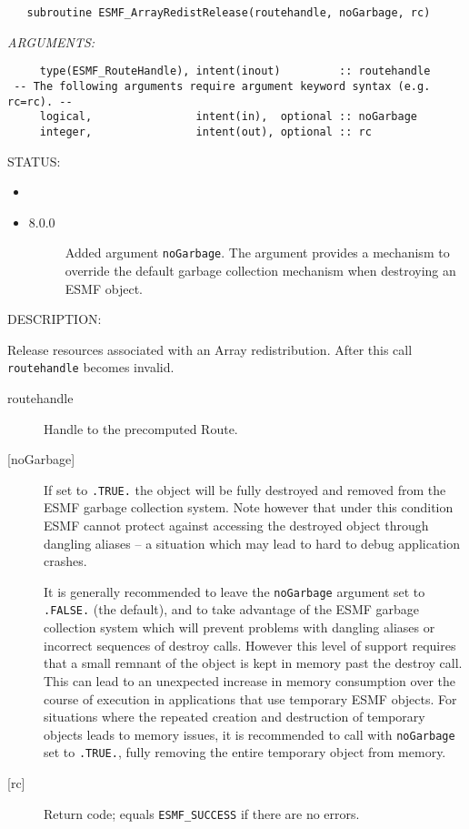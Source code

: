  
\begin{verbatim}   subroutine ESMF_ArrayRedistRelease(routehandle, noGarbage, rc)
   \end{verbatim}{\em ARGUMENTS:}
\begin{verbatim}     type(ESMF_RouteHandle), intent(inout)         :: routehandle
 -- The following arguments require argument keyword syntax (e.g. rc=rc). --
     logical,                intent(in),  optional :: noGarbage
     integer,                intent(out), optional :: rc\end{verbatim}
{\sf STATUS:}
   \begin{itemize}
   \item{}
   \item{}
   \begin{description}
   \item[8.0.0] Added argument {\tt noGarbage}.
     The argument provides a mechanism to override the default garbage collection
     mechanism when destroying an ESMF object.
   \end{description}
   \end{itemize}
  
{\sf DESCRIPTION:\\ }


     Release resources associated with an Array redistribution. After this call
     {\tt routehandle} becomes invalid.
  
     \begin{description}
     \item [routehandle]
       Handle to the precomputed Route.
     \item[{[noGarbage]}]
       If set to {\tt .TRUE.} the object will be fully destroyed and removed
       from the ESMF garbage collection system. Note however that under this 
       condition ESMF cannot protect against accessing the destroyed object 
       through dangling aliases -- a situation which may lead to hard to debug 
       application crashes.
   
       It is generally recommended to leave the {\tt noGarbage} argument
       set to {\tt .FALSE.} (the default), and to take advantage of the ESMF 
       garbage collection system which will prevent problems with dangling
       aliases or incorrect sequences of destroy calls. However this level of
       support requires that a small remnant of the object is kept in memory
       past the destroy call. This can lead to an unexpected increase in memory
       consumption over the course of execution in applications that use 
       temporary ESMF objects. For situations where the repeated creation and 
       destruction of temporary objects leads to memory issues, it is 
       recommended to call with {\tt noGarbage} set to {\tt .TRUE.}, fully 
       removing the entire temporary object from memory.
     \item [{[rc]}]
       Return code; equals {\tt ESMF\_SUCCESS} if there are no errors.
     \end{description}
   
